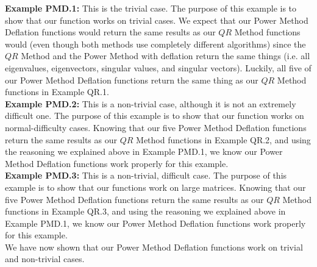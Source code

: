 \documentclass{article}
\begin{document}
\noindent \textbf{Example PMD.1: }This is the trivial case. The purpose of this example is to show that our function works on trivial cases. We expect that our Power Method Deflation functions would return the same results as our $QR$ Method functions would (even though both methods use completely different algorithms) since the $QR$ Method and the Power Method with deflation return the same things (i.e. all eigenvalues, eigenvectors, singular values, and singular vectors). Luckily, all five of our Power Method Deflation functions return the same thing as our $QR$ Method functions in Example QR.1.\\

\noindent \textbf{Example PMD.2: }This is a non-trivial case, although it is not an extremely difficult one. The purpose of this example is to show that our function works on normal-difficulty cases. Knowing that our five Power Method Deflation functions return the same results as our $QR$ Method functions in Example QR.2, and using the reasoning we explained above in Example PMD.1, we know our Power Method Deflation functions work properly for this example.\\

\noindent \textbf{Example PMD.3: }This is a non-trivial, difficult case. The purpose of this example is to show that our functions work on large matrices. Knowing that our five Power Method Deflation functions return the same results as our $QR$ Method functions in Example QR.3, and using the reasoning we explained above in Example PMD.1, we know our Power Method Deflation functions work properly for this example. \\

\noindent We have now shown that our Power Method Deflation functions work on trivial and non-trivial cases.
\end{document}
